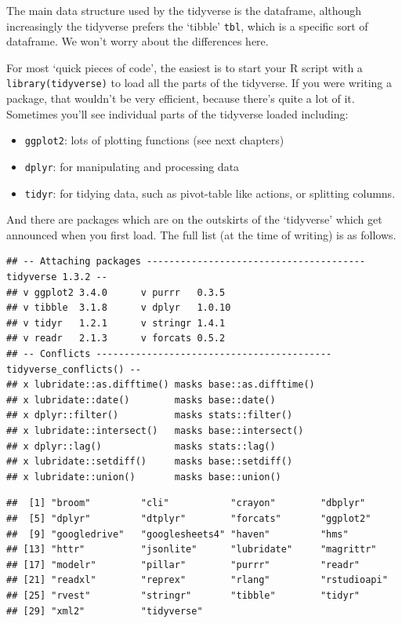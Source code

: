 \documentclass[
]{book}
\providecommand{\tightlist}{%
  \setlength{\itemsep}{0pt}\setlength{\parskip}{0pt}}
\begin{document}
The main data structure used by the tidyverse is the dataframe, although increasingly the tidyverse prefers the `tibble' \texttt{tbl}, which is a specific sort of dataframe. We won't worry about the differences here.

For most `quick pieces of code', the easiest is to start your R script with a \texttt{library(tidyverse)} to load all the parts of the tidyverse. If you were writing a package, that wouldn't be very efficient, because there's quite a lot of it. Sometimes you'll see individual parts of the tidyverse loaded including:

\begin{itemize}
\tightlist
\item
  \texttt{ggplot2}: lots of plotting functions (see next chapters)
\item
  \texttt{dplyr}: for manipulating and processing data
\item
  \texttt{tidyr}: for tidying data, such as pivot-table like actions, or splitting columns.
\end{itemize}

And there are packages which are on the outskirts of the `tidyverse' which get announced when you first load. The full list (at the time of writing) is as follows.

\begin{verbatim}
## -- Attaching packages --------------------------------------- tidyverse 1.3.2 --
## v ggplot2 3.4.0      v purrr   0.3.5 
## v tibble  3.1.8      v dplyr   1.0.10
## v tidyr   1.2.1      v stringr 1.4.1 
## v readr   2.1.3      v forcats 0.5.2 
## -- Conflicts ------------------------------------------ tidyverse_conflicts() --
## x lubridate::as.difftime() masks base::as.difftime()
## x lubridate::date()        masks base::date()
## x dplyr::filter()          masks stats::filter()
## x lubridate::intersect()   masks base::intersect()
## x dplyr::lag()             masks stats::lag()
## x lubridate::setdiff()     masks base::setdiff()
## x lubridate::union()       masks base::union()
\end{verbatim}

\begin{verbatim}
##  [1] "broom"         "cli"           "crayon"        "dbplyr"       
##  [5] "dplyr"         "dtplyr"        "forcats"       "ggplot2"      
##  [9] "googledrive"   "googlesheets4" "haven"         "hms"          
## [13] "httr"          "jsonlite"      "lubridate"     "magrittr"     
## [17] "modelr"        "pillar"        "purrr"         "readr"        
## [21] "readxl"        "reprex"        "rlang"         "rstudioapi"   
## [25] "rvest"         "stringr"       "tibble"        "tidyr"        
## [29] "xml2"          "tidyverse"
\end{verbatim}
\end{document}
